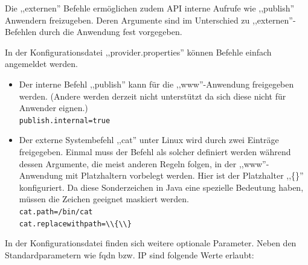 \documentclass[oneside, ngerman, toc=bibliography,bibliography=totoc,listof=entryprefix, open=right,numbers=noenddot,fontsize=12pt]{scrbook}
\begin{document}
Die ,,externen'' Befehle ermöglichen zudem API interne Aufrufe wie ,,publish'' Anwendern freizugeben.
Deren Argumente sind im Unterschied zu ,,externen''-Befehlen durch die Anwendung fest vorgegeben. 

\bigskip
In der Konfigurationsdatei ,,provider.properties'' können Befehle einfach angemeldet werden.

\begin{itemize}
    \item Der interne Befehl ,,publish'' kann für die ,,www''-Anwendung freigegeben werden.
    (Andere werden derzeit nicht unterstützt da sich diese nicht für Anwender eignen.)\\
    \verb|publish.internal=true|
    
    \item Der externe Systembefehl ,,cat'' unter Linux wird durch zwei Einträge freigegeben. Einmal muss der Befehl als solcher definiert werden während dessen Argumente, die meist anderen Regeln folgen, in der ,,www''-Anwendung mit Platzhaltern vorbelegt werden. Hier ist der Platzhalter ,,\{\}'' konfiguriert. Da  diese Sonderzeichen in Java eine spezielle Bedeutung haben, müssen die Zeichen geeignet maskiert werden.
    \\
    \verb|cat.path=/bin/cat|\\
    \verb|cat.replacewithpath=\\{\\}|
    
\end{itemize}

 

In der Konfigurationsdatei finden sich weitere optionale Parameter. Neben den Standardparametern wie \acrshort{fqdn} bzw. IP sind folgende Werte erlaubt:\\
\end{document}
